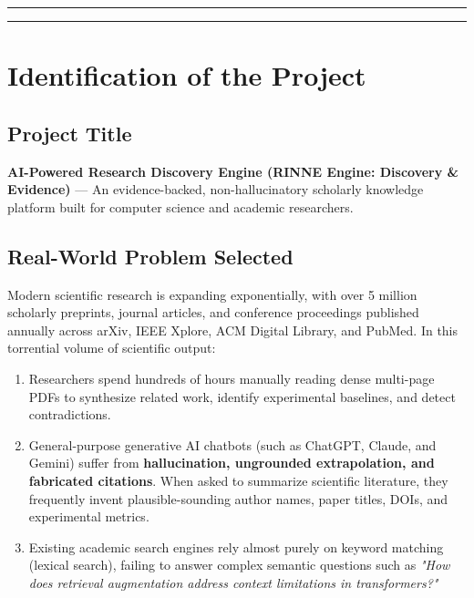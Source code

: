 \documentclass[11pt,a4paper,titlepage]{report}
\begin{document}
\clearpage

\tableofcontents
\vspace{1.2em}
\noindent\rule{\linewidth}{0.4pt}
\vspace{0.8em}
\listoffigures
\vspace{1.2em}
\noindent\rule{\linewidth}{0.4pt}
\vspace{0.8em}
\listoftables
\clearpage

\chapter{Identification of the Project}

\section{Project Title}
\textbf{AI-Powered Research Discovery Engine (RINNE Engine: Discovery \& Evidence)} --- An evidence-backed, non-hallucinatory scholarly knowledge platform built for computer science and academic researchers.

\section{Real-World Problem Selected}
Modern scientific research is expanding exponentially, with over 5 million scholarly preprints, journal articles, and conference proceedings published annually across arXiv, IEEE Xplore, ACM Digital Library, and PubMed. In this torrential volume of scientific output:
\begin{enumerate}
    \item Researchers spend hundreds of hours manually reading dense multi-page PDFs to synthesize related work, identify experimental baselines, and detect contradictions.
    \item General-purpose generative AI chatbots (such as ChatGPT, Claude, and Gemini) suffer from \textbf{hallucination, ungrounded extrapolation, and fabricated citations}. When asked to summarize scientific literature, they frequently invent plausible-sounding author names, paper titles, DOIs, and experimental metrics.
    \item Existing academic search engines rely almost purely on keyword matching (lexical search), failing to answer complex semantic questions such as \textit{"How does retrieval augmentation address context limitations in transformers?"}
\end{enumerate}
\end{document}
